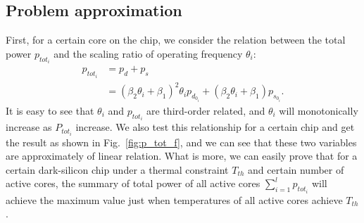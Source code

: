 \subsection{Problem approximation}
First, for a certain core on the chip, we consider the relation between the total power $p_{tot_{i}}$ and the scaling ratio of operating frequency 
$\theta_i$:
\begin{equation}\label{p_tot and theta} 
\begin{split}
p_{tot_{i}} &=p_d + p_s\\
&= (\beta_{2} \theta_{i} + \beta_{1})^2 \theta_{i} p_{d_{0_i}} + (\beta_2 \theta_i + \beta_1) p_{s_{0_i}}.
\end{split}
\end{equation}  
It is easy to see that $\theta_i$ and $p_{tot_{i}}$ are third-order related, and $\theta_i$ will monotonically increase as 
$P_{tot_{i}}$ increase. We also test this relationship for a certain chip and get the result as shown in Fig.~\ref{fig:p_tot_f}, and we 
can see that these two variables are approximately of linear relation. 
What is more, we can easily prove that for a certain dark-silicon chip under a thermal constraint $T_{th}$ and certain number of active cores, 
the summary of total power of all active cores $\sum_{i=1}^l p_{tot_{i}}$ will achieve the maximum value just when temperatures of all active cores achieve $T_{th}$.  

